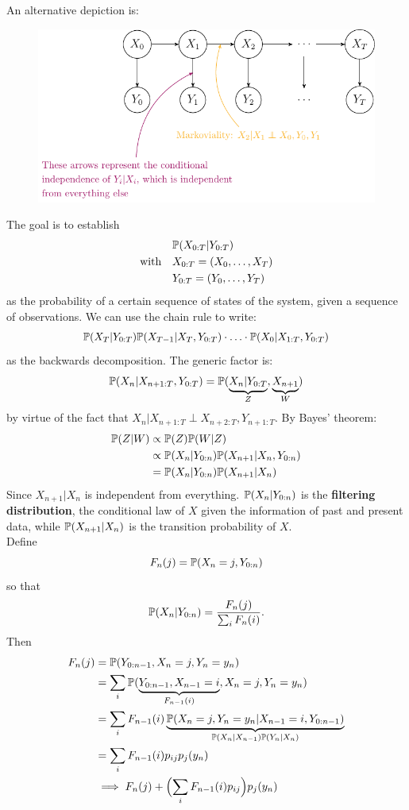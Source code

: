 \documentclass{article}
\begin{document}
An alternative depiction is:
\begin{figure}[H]
    \centering
       \includegraphics{standalones/pdfs/hid}
    \label{hiddalt}
\end{figure}
The goal is to establish
\begin{align*}
    &\mathbb{P}(X_{0:T}|Y_{0:T})\\
    \text{with}\quad &X_{0:T}=(X_0,\ldots,X_T)\\
    &Y_{0:T}=(Y_0,\ldots,Y_T)
\end{align*}
as the probability of a certain sequence of states of the system, given a sequence of observations. We can use the chain rule to write:
\[
\mathbb{P}(X_T|Y_{0:T})\mathbb{P}(X_{T-1}|X_T,Y_{0:T})\cdot\ldots\cdot\mathbb{P}(X_0|X_{1:T},Y_{0:T})
\]
as the backwards decomposition. The generic factor is:
\begin{equation*}
    \prob(X_n|X_{n+1:T},Y_{0:T})=\prob(\underbrace{X_n|Y_{0:T}}_{\mathclap{Z}},\underbrace{X_{n+1}}_{W})
\end{equation*}
by virtue of the fact that $X_n|X_{n+1:T}\perp X_{n+2:T},Y_{n+1:T}$. By Bayes' theorem:
\begin{align*}
    \mathbb{P}(Z|W)&\propto\mathbb{P}(Z)\mathbb{P}(W|Z)\\
    &\propto\mathbb{P}(X_n|Y_{0:n})\mathbb{P}(X_{n+1}|X_n,Y_{0:n})\\
    &=\mathbb{P}(X_n|Y_{0:n})\mathbb{P}(X_{n+1}|X_n)
\end{align*}
Since $X_{n+1}|X_n$ is independent from everything. $\mathbb{P}(X_n|Y_{0:n})$ is the \textbf{filtering distribution}, the conditional law of $X$ given the information of past and present data, while $\mathbb{P}(X_{n+1}|X_n)$ is the transition probability of $X$. \\Define
\[F_n(j)=\mathbb{P}(X_n=j,Y_{0:n})\] so that
\[
\mathbb{P}(X_n|Y_{0:n})=\frac{F_n(j)}{\sum_i F_n(i)}.
\]
Then
\begin{align*}
    F_n(j)&=\mathbb{P}(Y_{0:n-1},X_n=j,Y_n=y_n)\\
    &=\sum_i\mathbb{P}(\underbrace{Y_{0:n-1},X_{n-1}=i}_{F_{n-1}(i)},X_n=j,Y_n=y_n)\\
    &=\sum_i F_{n-1}(i)\underbrace{\mathbb{P}(X_n=j,Y_n=y_n|X_{n-1}=i,Y_{0:n-1})}_{\mathbb{P}(X_n|X_{n-1})\mathbb{P}(Y_n|X_n)}\\
    &=\sum_i F_{n-1}(i)p_{ij}p_j(y_n)\\
    &\implies F_n(j)+\Bigl(\sum_iF_{n-1}(i)p_{ij}\Bigr)p_j(y_n)
\end{align*}
\end{document}

